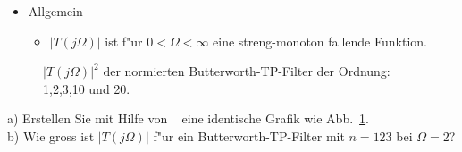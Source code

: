 \begin{itemize}
\begin{itemize}
\end{itemize}
\item Allgemein
\begin{itemize}
\item $|T(j\Omega)|$ ist f"ur $0<\Omega<\infty$ eine streng-monoton fallende Funktion. 
\end{itemize}
\end{itemize}

\begin{figure}[!htb]%
\vspace*{-3mm}
\begin{center}
  \vspace*{-2mm}\caption{$|T(j\Omega)|^2$ der normierten Butterworth-TP-Filter der Ordnung: 1,2,3,10 und 20.}\label{butterworth_quadrat}
\end{center}
\vspace*{-6mm}
\end{figure}
\aufg
a) Erstellen Sie mit Hilfe von \matlogo~ eine identische Grafik wie Abb.~\ref{butterworth_quadrat}.\\ b) Wie gross ist $|T(j\Omega)|$ f"ur ein Butterworth-TP-Filter mit $n=123$ bei $\Omega=2$?\\




